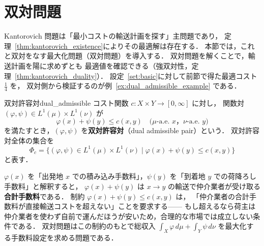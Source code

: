 \documentclass[uplatex, dvipdfmx]{jsarticle}
\begin{document}
\section{双対問題}

Kantorovich 問題は「最小コストの輸送計画を探す」主問題であり，
定理~\ref{thm:kantorovich_existence}によりその最適解は存在する．
本節では，これと双対をなす最大化問題（双対問題）を導入する．
双対問題を解くことで，輸送計画を陽に求めずとも
最適値を確認できる（強双対性，定理~\ref{thm:kantorovich_duality}）．
設定~\ref{set:basic}に対して前節で得た最適コスト $\tfrac{1}{4}$ を，
双対側から検証するのが例~\ref{ex:dual_admissible_example} である．

\begin{definition}{双対許容対}{dual_admissible}
コスト関数 $c\colon X\times Y\to[0,\infty]$ に対し，
関数対 $(\varphi,\psi)\in L^1(\mu)\times L^1(\nu)$ が
\[
  \varphi(x)+\psi(y)\le c(x,y)
  \quad \text{($\mu$-a.e. $x$，$\nu$-a.e. $y$)}
\]
を満たすとき，$(\varphi,\psi)$ を\textbf{双対許容対}（dual admissible pair）という．
双対許容対全体の集合を
\[
  \Phi_c = \bigl\{(\varphi,\psi)\in L^1(\mu)\times L^1(\nu)
  \mid \varphi(x)+\psi(y)\le c(x,y)\bigr\}
\]
と表す．
\end{definition}

$\varphi(x)$ を「出発地 $x$ での積み込み手数料」，$\psi(y)$ を「到着地 $y$ での荷降ろし手数料」と解釈すると，
$\varphi(x)+\psi(y)$ は $x\to y$ の輸送で仲介業者が受け取る\textbf{合計手数料}である．
制約 $\varphi(x)+\psi(y)\le c(x,y)$ は，
「仲介業者の合計手数料が直接輸送コストを超えない」ことを要求する——
もし超えるなら荷主は仲介業者を使わず自前で運んだほうが安いため，合理的な市場では成立しない条件である．
双対問題はこの制約のもとで総収入 $\int_X\varphi\,d\mu+\int_Y\psi\,d\nu$ を最大化する手数料設定を求める問題である．
\end{document}
